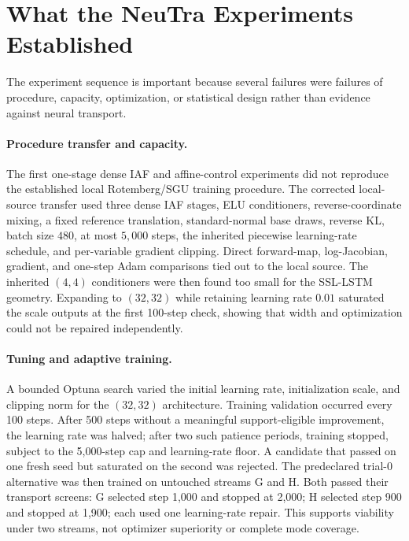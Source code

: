 \section{What the NeuTra Experiments Established}
\label{sec:bf-ssl-lstm-neutra-experiment-history}

The experiment sequence is important because several failures were failures of
procedure, capacity, optimization, or statistical design rather than evidence
against neural transport.

\paragraph{Procedure transfer and capacity.}
The first one-stage  dense IAF and affine-control experiments did
not reproduce the established local Rotemberg/SGU training procedure.  The
corrected local-source transfer used three dense IAF stages, ELU conditioners,
reverse-coordinate mixing, a fixed reference translation, standard-normal
base draws, reverse KL, batch size $480$, at most $5{,}000$ steps, the inherited
piecewise learning-rate schedule, and per-variable gradient clipping.  Direct
forward-map, log-Jacobian, gradient, and one-step Adam comparisons tied out to
the local source.  The inherited $(4,4)$ conditioners were then found too small
for the SSL-LSTM geometry.  Expanding to $(32,32)$ while retaining learning
rate $0.01$ saturated the scale outputs at the first 100-step check, showing
that width and optimization could not be repaired independently.

\paragraph{Tuning and adaptive training.}
A bounded Optuna search varied the initial learning rate, initialization scale,
and clipping norm for the $(32,32)$ architecture.  Training validation occurred
every 100 steps.  After 500 steps without a meaningful support-eligible
improvement, the learning rate was halved; after two such patience periods,
training stopped, subject to the 5,000-step cap and learning-rate floor.  A
candidate that passed on one fresh seed but saturated on the second was
rejected.  The predeclared trial-0 alternative was then trained on untouched
streams G and H.  Both passed their transport screens: G selected step 1,000
and stopped at 2,000; H selected step 900 and stopped at 1,900; each used one
learning-rate repair.  This supports viability under two streams, not optimizer
superiority or complete mode coverage.

